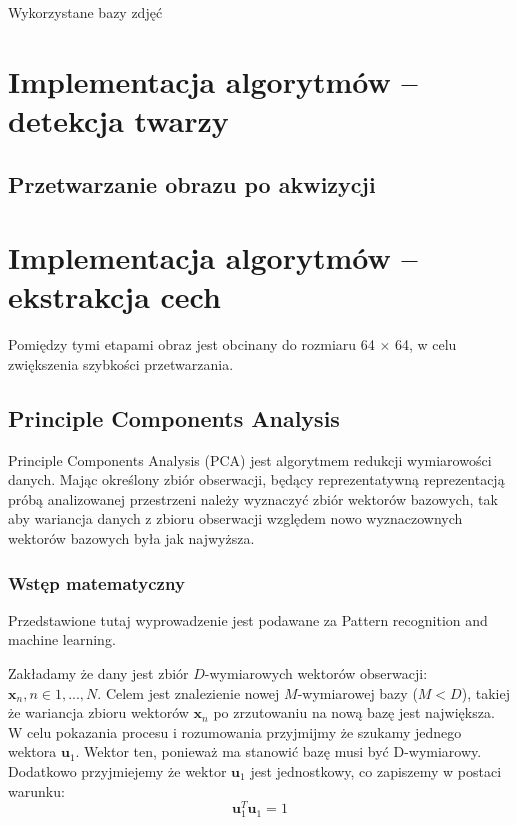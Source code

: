 \documentclass{article}
\newcommand{\bb}{\textbf}
\begin{document}
Wykorzystane bazy zdjęć

\section{Implementacja algorytmów – detekcja twarzy}
 
\subsection{Przetwarzanie obrazu po akwizycji} 
 
 
 \newpage
 
\section{Implementacja algorytmów – ekstrakcja cech}

Pomiędzy tymi etapami obraz jest obcinany do rozmiaru 64 $\times$ 64, w celu zwiększenia szybkości przetwarzania.
 
\subsection{Principle Components Analysis}

Principle Components Analysis (PCA) jest algorytmem redukcji wymiarowości danych. Mając określony zbiór obserwacji, będący reprezentatywną reprezentacją próbą analizowanej przestrzeni należy wyznaczyć zbiór wektorów bazowych, tak aby wariancja danych z zbioru obserwacji względem nowo wyznaczownych wektorów bazowych była jak najwyższa.

\subsubsection{Wstęp matematyczny}

Przedstawione tutaj wyprowadzenie jest podawane za Pattern recognition and machine learning.

Zakładamy że dany jest zbiór $D$-wymiarowych wektorów obserwacji: $\bb{x}_n , n \in 1,...,N $. Celem jest znalezienie nowej $M$-wymiarowej bazy ($M < D$), takiej że wariancja zbioru wektorów $\bb{x}_n$ po zrzutowaniu na nową bazę jest największa. W celu pokazania procesu i rozumowania przyjmijmy że szukamy jednego wektora $\bb{u}_1$. Wektor ten, ponieważ ma stanowić bazę musi być D-wymiarowy. Dodatkowo przyjmiejemy że wektor $\bb{u}_1$ jest jednostkowy, co zapiszemy w postaci warunku:
\begin{equation} \label{eq:wektor_jednostkowy}
	\bb{u}_1^{T}\bb{u}_1 = 1
\end{equation}
\end{document}
